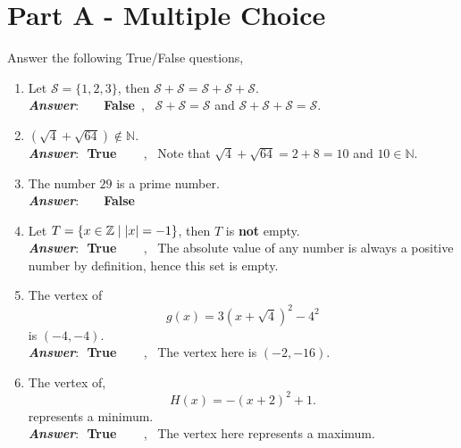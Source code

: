 \documentclass[12pt]{article} %
\begin{document}
\section*{Part A - Multiple Choice}
\begin{qstn} %
  Answer the following True/False questions,
  \begin{enumerate}
    \item Let $\mathcal{S} = \{1,2,3\}$, then $\mathcal{S} + \mathcal{S} = \mathcal{S} + \mathcal{S} +
      \mathcal{S}$.\\ 
       \textbf{\emph{Answer}}:\,\,  \,\,\,\,\,\, \textbf{False}\, , \,
       $\mathcal{S} + \mathcal{S} = \mathcal{S}$ and $\mathcal{S} + \mathcal{S} + \mathcal{S} = \mathcal{S}$.

    \item $\left(\sqrt{4} + \sqrt{64} \right) \not \in \mathbb N$.\\
       \textbf{\emph{Answer}}:\,\, \textbf{True} \,\,\,\,\,\, \, , \,
       Note that $\sqrt{4}  + \sqrt{64} = 2 + 8 = 10$ and $10 \in \mathbb N$.

    \item The number $29$ is a prime number.\\
       \textbf{\emph{Answer}}:\,\,  \,\,\,\,\,\, \textbf{False}

    \item Let $T = \{x \in \Z \mid \left|x\right| = -1\} $, then $T$ is \textbf{not} empty.\\
       \textbf{\emph{Answer}}:\,\, \textbf{True} \,\,\,\,\,\, \, , \,
       The absolute value of any number is always a positive number by definition, hence this set is empty.

    \item The vertex of 
      \[
        g(x) = 3\left( x + \sqrt{4}  \right)^2 - 4^2  
      \] is $(-4,-4)$.\\ 
       \textbf{\emph{Answer}}:\,\, \textbf{True} \,\,\,\,\,\, \, , \,
       The vertex here is $(-2,-16)$.

    \item The vertex of,
      \[
            H(x) = -\left( x + 2 \right)^2 + 1
      .\] represents a minimum.\\
       \textbf{\emph{Answer}}:\,\, \textbf{True} \,\,\,\,\,\, \, , \,
       The vertex here represents a maximum.



\end{enumerate}
\end{qstn}
\end{document}
